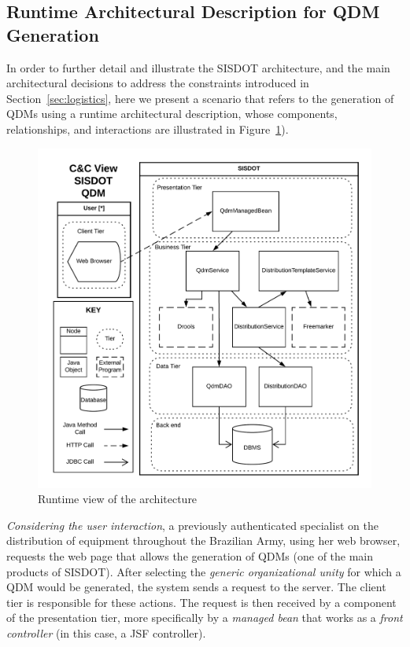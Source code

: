 \documentclass[AMA,STIX1COL,hidelinks]{WileyNJD-v2}
\begin{document}
\subsection{Runtime Architectural Description for QDM Generation}

In order to further detail and illustrate the SISDOT architecture, and the main architectural decisions to address the constraints introduced in Section~\ref{sec:logistics}, here we present a scenario that refers to the generation of QDMs using a runtime architectural description, whose components, relationships, and interactions are illustrated in Figure~\ref{fig:runtime_qdm}). 

\begin{figure}[!ht] 
    \centering
	\includegraphics[scale=0.7]{img/runtimeView_qdm.png}
	\caption{Runtime view of the architecture} 
	\label{fig:runtime_qdm}
\end{figure}

\emph{Considering the user interaction}, a previously authenticated specialist on the distribution of equipment throughout the Brazilian Army, using her web browser, requests the web page that allows the generation of QDMs (one of the main products of SISDOT). 
After selecting the \emph{generic organizational unity} for which a QDM would be generated, the system sends a request to the server. The client tier is responsible for these actions. The request is then received by a component of the presentation tier, more specifically by a \emph{managed bean} that works as a \emph{front controller} (in this case, a JSF controller). 
\end{document}
